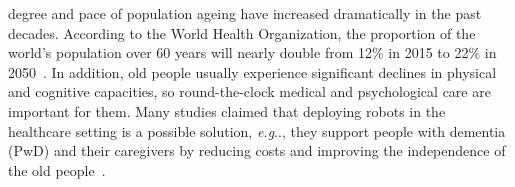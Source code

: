 \documentclass[10pt,journal,compsoc]{IEEEtran}
\makeatletter
\DeclareRobustCommand\onedot{\futurelet\@let@token\@onedot}
\def\@onedot{\ifx\@let@token.\else.\null\fi\xspace}
\def\eg{\emph{e.g}\onedot} \def\Eg{\emph{E.g}\onedot}
\makeatother
\begin{document}
\maketitle
\IEEEdisplaynontitleabstractindextext

%
\IEEEpeerreviewmaketitle






 degree and pace of population ageing have increased dramatically in the past decades. According to the World Health Organization, the proportion of the world's population over 60 years will nearly double from 12\% in 2015 to 22\% in 2050~\cite{WHO2021Ageing}. In addition, old people usually experience significant declines in physical and cognitive capacities, so round-the-clock medical and psychological care are important for them. Many studies claimed that deploying robots in the healthcare setting is a possible solution, \eg, they support people with dementia (PwD) and their caregivers by reducing costs and improving the independence of the old people~\cite{Ghafurian2021Social, Perugia2020ENGAGEDEM}.
\end{document}
